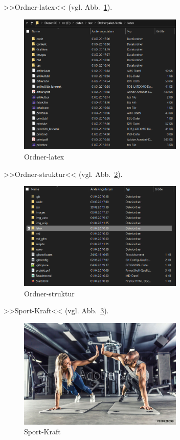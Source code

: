 >>Ordner-latex<< (vgl. Abb.~\ref{fig:Ordner-latex}).%
\begin{figure}[H]%
  \centering
  \includegraphics[width=0.7\textwidth]{images/Ordner-latex}
  \caption{Ordner-latex}%
  \label{fig:Ordner-latex}%
\end{figure}
  

>>Ordner-struktur<< (vgl. Abb.~\ref{fig:Ordner-struktur}).%
\begin{figure}[H]%
  \centering
  \includegraphics[width=0.7\textwidth]{images/Ordner-struktur}
  \caption{Ordner-struktur}%
  \label{fig:Ordner-struktur}%
\end{figure}
  

>>Sport-Kraft<< (vgl. Abb.~\ref{fig:Sport-Kraft}).%
\begin{figure}[H]%
  \centering
  \includegraphics[width=0.7\textwidth]{images/Sport-Kraft}
  \caption{Sport-Kraft}%
  \label{fig:Sport-Kraft}%
\end{figure}
  

